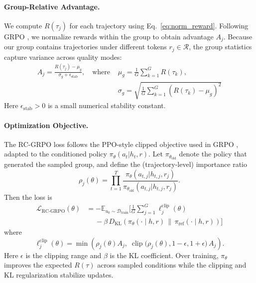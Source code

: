 \documentclass{article}
\newcommand{\SL}[1]{{\textcolor{red}{SL: #1}}}
\theoremstyle{plain}
\theoremstyle{definition}
\theoremstyle{remark}
\begin{document}
\paragraph{Group-Relative Advantage.}We compute $R(\tau_j)$ for each trajectory using Eq.~\ref{eq:norm_reward}. Following GRPO \cite{deepseek2025r1}, we normalize rewards within the group to obtain advantage $A_j$. Because our group contains trajectories under different tokens $r_j \in \mathcal{R}$, the group statistics capture variance across quality modes:
\begin{equation}
\begin{split}
    A_j = \frac{R(\tau_j) - \mu_g}{\sigma_g + \epsilon_{\text{stab}}}, \quad \text{where } & \mu_g = \frac{1}{G}\sum_{k=1}^G R(\tau_k), \\
    & \sigma_g = \sqrt{\frac{1}{G}\sum_{k=1}^G (R(\tau_k) - \mu_g)^2}
\end{split}
\end{equation}
Here $\epsilon_{\text{stab}} > 0$ is a small numerical stability constant.

\paragraph{Optimization Objective.}
The RC-GRPO loss follows the PPO-style clipped objective used in GRPO \cite{deepseek2025r1}, adapted to the conditioned policy $\pi_\theta(a_t | h_t, r)$.
Let $\pi_{\theta_{\text{old}}}$ denote the policy that generated the sampled group, and define the (trajectory-level) importance ratio
\begin{equation}
\rho_j(\theta) = \prod_{t=1}^{T} \frac{\pi_\theta(a_{t,j} | h_{t,j}, r_j)}{\pi_{\theta_{\text{old}}}(a_{t,j} | h_{t,j}, r_j)}.
\end{equation}
Then the loss is
\begin{equation}
\label{eq:rcgrpo_loss}
\begin{aligned}
\mathcal{L}_{\text{RC-GRPO}}(\theta)
&= -\mathbb{E}_{u_0 \sim \mathcal{D}_{\text{train}}}
\Bigg[
\frac{1}{G}\sum_{j=1}^{G} \ell^{\text{clip}}_j(\theta) \\
&\quad\; - \beta\, D_{\text{KL}}\!\left(\pi_\theta(\cdot\mid h,r) \,\|\, \pi_{\text{ref}}(\cdot\mid h,r)\right)
\Bigg]
\end{aligned}
\end{equation}
where
\begin{equation}
\ell^{\text{clip}}_j(\theta)
= \min\!\left(
\rho_j(\theta) A_j,\;
\operatorname{clip}\big(\rho_j(\theta), 1-\epsilon, 1+\epsilon\big)\,A_j
\right).
\end{equation}
Here $\epsilon$ is the clipping range and $\beta$ is the KL coefficient. Over training, $\pi_\theta$ improves the expected $R(\tau)$ across sampled conditions while the clipping and KL regularization stabilize updates.
\end{document}
